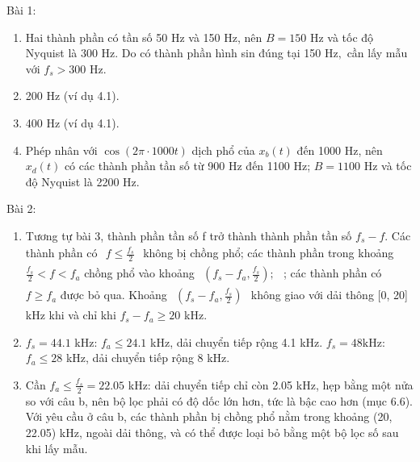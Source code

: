 \documentclass[
  10
]{article}
\begin{document}
Bài 1:

\begin{enumerate}
\def\labelenumi{\alph{enumi}.}
\item
  Hai thành phần có tần số 50 Hz và 150 Hz, nên \(B = 1 5 0\) Hz và tốc
  độ Nyquist là 300 Hz. Do có thành phần hình sin đúng tại 150
  \(\mathrm { H z , }\) cần lấy mẫu với \(f _ { s } > 3 0 0\) Hz.
\item
  200 Hz (ví dụ 4.1).
\item
  400 Hz (ví dụ 4.1).
\item
  Phép nhân với \(\cos ( 2 \pi \cdot 1 0 0 0 t )\) dịch phổ của
  \(x _ { b } ( t )\) đến 1000 Hz, nên \(x _ { d } ( t )\) có các thành
  phần tần số từ 900 Hz đến 1100 Hz; \(B = 1 1 0 0\) Hz và tốc độ
  Nyquist là 2200 Hz.
\end{enumerate}

Bài 2:

\begin{enumerate}
\def\labelenumi{\alph{enumi}.}
\item
  Tương tự bài 3, thành phần tần số f trở thành thành phần tần số
  \(f _ { s } - f .\) Các thành phần có
  \(\begin{array} { r } { f \le \frac { f _ { s } } { 2 } } \end{array}\)
  không bị chồng phổ; các thành phần trong khoảng
  \(\textstyle { \frac { f _ { s } } { 2 } } < f < f _ { a }\) chồng phổ
  vào khoảng
  \(\begin{array} { r } { ( f _ { s } - f _ { a } , \frac { f _ { s } } { 2 } ) ; } \end{array}\)
  ; các thành phần có \(f \geq f _ { a }\) được bỏ qua. Khoảng
  \(\begin{array} { r } { ( f _ { s } - f _ { a } , \frac { f _ { s } } { 2 } ) } \end{array}\)
  không giao với dải thông {[}0, 20{]} kHz khi và chỉ khi
  \(f _ { s } - f _ { a } \ge 2 0\) kHz.
\item
  \(f _ { s } = 4 4 . 1\) kHz: \(f _ { a } \leq 2 4 . 1\) kHz, dải
  chuyển tiếp rộng 4.1 kHz.
  \(f _ { s } = 4 8 \mathrm { { k H z } \mathrm { { : } } }\)
  \(f _ { a } \leq 2 8\) kHz, dải chuyển tiếp rộng 8 kHz.
\item
  Cần \(f _ { a } \le \frac { f _ { s } } { 2 } = 2 2 . 0 5\) kHz: dải
  chuyển tiếp chỉ còn 2.05 kHz, hẹp bằng một nửa so với câu b, nên bộ
  lọc phải có độ dốc lớn hơn, tức là bậc cao hơn (mục 6.6). Với yêu cầu
  ở câu b, các thành phần bị chồng phổ nằm trong khoảng (20, 22.05) kHz,
  ngoài dải thông, và có thể được loại bỏ bằng một bộ lọc số sau khi lấy
  mẫu.
\end{enumerate}
\end{document}
